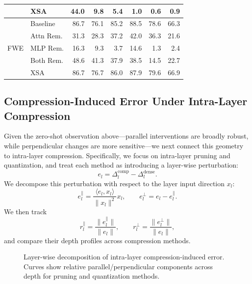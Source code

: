 \begin{table}[t]
\begin{tabular}{llrrrrrr}
      & XSA & 44.0 & 9.8 & 5.4 & 1.0 & 0.6 & 0.9 \\
    \midrule
    \multirow{5}{*}{FWE}
      & Baseline & 86.7 & 76.1 & 85.2 & 88.5 & 78.6 & 66.3 \\
      & Attn Rem. & 31.3 & 28.3 & 37.2 & 42.0 & 36.3 & 21.6 \\
      & MLP Rem. & 16.3 & 9.3 & 3.7 & 14.6 & 1.3 & 2.4 \\
      & Both Rem. & 48.6 & 41.3 & 37.9 & 38.5 & 14.5 & 22.7 \\
      & XSA & 86.7 & 76.7 & 86.0 & 87.9 & 79.6 & 66.9 \\
    \bottomrule
  \end{tabular}
\end{table}

\subsection{Compression-Induced Error Under Intra-Layer Compression}
\label{sec:compression-error-geometry}

Given the zero-shot observation above---parallel interventions are broadly
robust, while perpendicular changes are more sensitive---we next connect this
geometry to intra-layer compression. Specifically, we focus on intra-layer
pruning and quantization, and treat each method as introducing a layer-wise
perturbation:
\begin{equation}
  e_l = \Delta_l^{\text{comp}} - \Delta_l^{\text{dense}}.
\end{equation}
We decompose this perturbation with respect to the layer input direction
$x_l$:
\begin{equation}
  e_l^{\parallel} =
  \frac{\langle e_l, x_l \rangle}{\|x_l\|^2}x_l,
  \qquad
  e_l^{\perp} = e_l - e_l^{\parallel}.
\end{equation}
We then track
\begin{equation}
  r_l^{\parallel}=\frac{\|e_l^{\parallel}\|}{\|e_l\|},
  \qquad
  r_l^{\perp}=\frac{\|e_l^{\perp}\|}{\|e_l\|},
\end{equation}
and compare their depth profiles across compression methods.

\begin{figure}[t]
  \centering
  \fbox{\rule{0pt}{4.8cm}\rule{0.9\linewidth}{0pt}}
  \caption{Layer-wise decomposition of intra-layer compression-induced error.
           Curves show relative parallel/perpendicular components across depth
           for pruning and quantization methods.}
  \label{fig:compression-error-geometry}
\end{figure}

